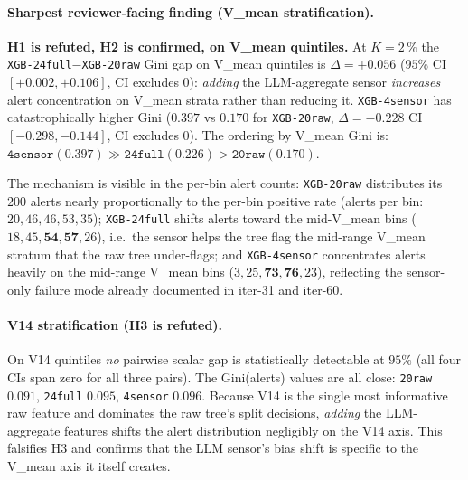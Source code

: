 \documentclass{article}
\begin{document}
\paragraph{Sharpest reviewer-facing finding (V\_mean stratification).}
\textbf{H1 is refuted, H2 is confirmed, on V\_mean quintiles.}
At $K{=}2\,\%$ the \texttt{XGB-24full}${-}$\texttt{XGB-20raw} Gini gap
on V\_mean quintiles is $\Delta = +0.056$ ($95\%$ CI $[+0.002, +0.106]$,
CI excludes 0): \emph{adding} the LLM-aggregate sensor \emph{increases}
alert concentration on V\_mean strata rather than reducing it.
\texttt{XGB-4sensor} has catastrophically higher Gini ($0.397$ vs
$0.170$ for \texttt{XGB-20raw}, $\Delta = -0.228$ CI $[-0.298, -0.144]$,
CI excludes 0). The ordering by V\_mean Gini is:
$\texttt{4sensor} (0.397) \gg \texttt{24full} (0.226) > \texttt{20raw}
(0.170)$.

The mechanism is visible in the per-bin alert counts:
\texttt{XGB-20raw} distributes its $200$ alerts nearly
proportionally to the per-bin positive rate (alerts per bin:
$20, 46, 46, 53, 35$);
\texttt{XGB-24full} shifts alerts toward the mid-V\_mean bins
($18, 45, \mathbf{54}, \mathbf{57}, 26$), i.e.\ the sensor helps
the tree flag the mid-range V\_mean stratum that the raw tree
under-flags; and \texttt{XGB-4sensor} concentrates alerts heavily on
the mid-range V\_mean bins ($3, 25, \mathbf{73}, \mathbf{76}, 23$),
reflecting the sensor-only failure mode already documented in iter-31
and iter-60.

\paragraph{V14 stratification (H3 is refuted).}
On V14 quintiles \emph{no} pairwise scalar gap is statistically detectable
at $95\%$ (all four CIs span zero for all three pairs). The
Gini(alerts) values are all close: \texttt{20raw} $0.091$,
\texttt{24full} $0.095$, \texttt{4sensor} $0.096$. Because V14 is the
single most informative raw feature and dominates the raw tree's split
decisions, \emph{adding} the LLM-aggregate features shifts the alert
distribution negligibly on the V14 axis. This falsifies H3 and confirms
that the LLM sensor's bias shift is specific to the V\_mean axis it
itself creates.
\end{document}
